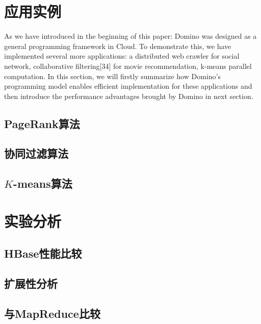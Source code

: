 \section{应用实例}
\label{section:apps}
As we have introduced in the beginning of this paper: Domino was designed as a general programming framework in Cloud. To demonstrate this, we have implemented several more applications: a distributed web crawler for social network, collaborative filtering[34] for movie recommendation, k-means parallel computation. In this section, we will firstly summarize how Domino’s programming model enables efficient implementation for these applications and then introduce the performance advantages brought by Domino in next section.
\subsection{PageRank算法}

\subsection{协同过滤算法}
\subsection{$K$-means算法}

\section{实验分析}
\label{section:exp}
\subsection{HBase性能比较}
\subsection{扩展性分析}
\subsection{与MapReduce比较}

